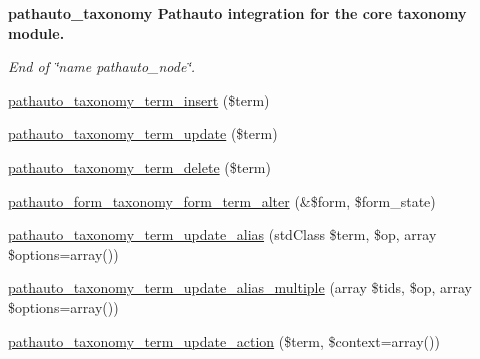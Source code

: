 \begin{Indent}{\bf pathauto\_\-taxonomy Pathauto integration for the core taxonomy module.}\par
{\em \label{_amgrpf3d505176dcb4134738fe102f7b4614c}
 End of \char`\"{}name pathauto\_\-node\char`\"{}. }\begin{DoxyCompactItemize}
\item 
\hyperlink{pathauto_8module_a835922153a91d17a66c4258256017e39}{pathauto\_\-taxonomy\_\-term\_\-insert} (\$term)
\item 
\hyperlink{pathauto_8module_ab861a0bd8ac0d1116d50dc5e446e510b}{pathauto\_\-taxonomy\_\-term\_\-update} (\$term)
\item 
\hyperlink{pathauto_8module_a8ac059064afc0e0a3a6f6e8e3820a2fa}{pathauto\_\-taxonomy\_\-term\_\-delete} (\$term)
\item 
\hyperlink{pathauto_8module_aa7283f26358021e712eed8d287d1799d}{pathauto\_\-form\_\-taxonomy\_\-form\_\-term\_\-alter} (\&\$form, \$form\_\-state)
\item 
\hyperlink{pathauto_8module_a80bfb73e9db12fd22e6cd9908a9bca26}{pathauto\_\-taxonomy\_\-term\_\-update\_\-alias} (stdClass \$term, \$op, array \$options=array())
\item 
\hyperlink{pathauto_8module_aeeb7b2b0dc21146863ea234e0fb9b427}{pathauto\_\-taxonomy\_\-term\_\-update\_\-alias\_\-multiple} (array \$tids, \$op, array \$options=array())
\item 
\hyperlink{pathauto_8module_a5d96ab0723a69f47adf684f49244a47b}{pathauto\_\-taxonomy\_\-term\_\-update\_\-action} (\$term, \$context=array())
\end{DoxyCompactItemize}
\end{Indent}
